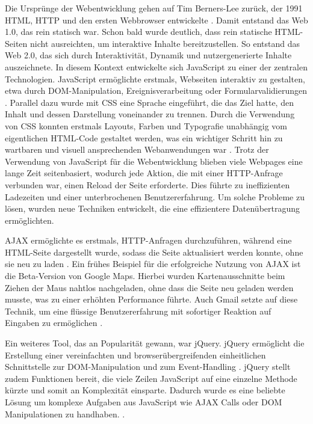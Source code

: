 \documentclass[oneside]{ausarbeitung}
\begin{document}
Die Ursprünge der Webentwicklung gehen auf Tim Berners-Lee zurück, der 1991 \ac{HTML}, \ac{HTTP} und den ersten Webbrowser entwickelte \parencite{cern-www}. Damit entstand das Web 1.0, das rein statisch war.
Schon bald wurde deutlich, dass rein statische \ac{HTML}-Seiten nicht ausreichten, um interaktive Inhalte bereitzustellen. So entstand das Web 2.0, das sich durch Interaktivität, Dynamik und nutzergenerierte Inhalte auszeichnete. In diesem Kontext entwickelte sich JavaScript zu einer der zentralen Technologien. JavaScript ermöglichte erstmals, Webseiten interaktiv zu gestalten, etwa durch \ac{DOM}-Manipulation, Ereignisverarbeitung oder Formularvalidierungen \parencite{js-history}.
Parallel dazu wurde mit \ac{CSS} eine Sprache eingeführt, die das Ziel hatte, den Inhalt und dessen Darstellung voneinander zu trennen. Durch die Verwendung von \ac{CSS} konnten erstmals Layouts, Farben und Typografie unabhängig vom eigentlichen \ac{HTML}-Code gestaltet werden, was ein wichtiger Schritt hin zu wartbaren und visuell ansprechenden Webanwendungen war \parencite{w3c_css_history}. Trotz der Verwendung von JavaScript für die Webentwicklung blieben viele Webpages eine lange Zeit seitenbasiert, wodurch jede Aktion, die mit einer \ac{HTTP}-Anfrage verbunden war, einen Reload der Seite erforderte. Dies führte zu ineffizienten Ladezeiten und einer unterbrochenen Benutzererfahrung. Um solche Probleme zu lösen, wurden neue Techniken entwickelt, die eine effizientere Datenübertragung ermöglichten. 

\ac{AJAX} ermöglichte es erstmals, \ac{HTTP}-Anfragen durchzuführen, während eine \ac{HTML}-Seite dargestellt wurde, sodass die Seite aktualisiert werden konnte, ohne sie neu zu laden \parencite{ajax-msdn}. Ein frühes Beispiel für die erfolgreiche Nutzung von \ac{AJAX} ist die Beta-Version von Google Maps. Hierbei wurden Kartenausschnitte beim Ziehen der Maus nahtlos nachgeladen, ohne dass die Seite neu geladen werden musste, was zu einer erhöhten Performance führte. Auch Gmail setzte auf diese Technik, um eine flüssige Benutzererfahrung mit sofortiger Reaktion auf Eingaben zu ermöglichen \parencite{paulson2005ajax}.

Ein weiteres Tool, das an Popularität gewann, war jQuery. jQuery ermöglicht die Erstellung einer vereinfachten und browserübergreifenden einheitlichen Schnittstelle zur \ac{DOM}-Manipulation und zum Event-Handling \parencite{taft2006jquery}. jQuery stellt zudem Funktionen bereit, die viele Zeilen JavaScript auf eine einzelne Methode kürzte und somit an Komplexität einsparte. Dadurch wurde es eine beliebte Lösung um komplexe Aufgaben aus JavaScript wie \ac{AJAX} Calls oder \ac{DOM} Manipulationen zu handhaben. \parencite{w3schoolsJquery}.
\end{document}
